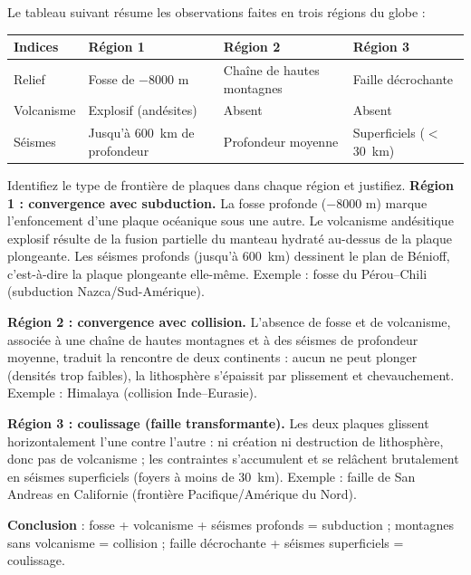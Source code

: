 \documentclass[11pt]{article}
\begin{document}
\begin{exoresolu}
Le tableau suivant résume les observations faites en trois régions du globe :
\begin{center}
\begin{tabularx}{\linewidth}{|l|X|X|X|}\hline
\rowcolor{popblueL} \textbf{Indices} & \textbf{Région 1} & \textbf{Région 2} & \textbf{Région 3} \\ \hline
Relief & Fosse de \num{-8000} m & Chaîne de hautes montagnes & Faille décrochante \\ \hline
Volcanisme & Explosif (andésites) & Absent & Absent \\ \hline
Séismes & Jusqu'à \SI{600}{km} de profondeur & Profondeur moyenne & Superficiels ($<$ \SI{30}{km}) \\ \hline
\end{tabularx}
\end{center}
Identifiez le type de frontière de plaques dans chaque région et justifiez.
\tcblower
\textbf{Région 1 : convergence avec subduction.} La fosse profonde (\num{-8000} m) marque l'enfoncement d'une plaque océanique sous une autre. Le volcanisme andésitique explosif résulte de la fusion partielle du manteau hydraté au-dessus de la plaque plongeante. Les séismes profonds (jusqu'à \SI{600}{km}) dessinent le plan de Bénioff, c'est-à-dire la plaque plongeante elle-même. Exemple : fosse du Pérou--Chili (subduction Nazca/Sud-Amérique).

\textbf{Région 2 : convergence avec collision.} L'absence de fosse et de volcanisme, associée à une chaîne de hautes montagnes et à des séismes de profondeur moyenne, traduit la rencontre de deux continents : aucun ne peut plonger (densités trop faibles), la lithosphère s'épaissit par plissement et chevauchement. Exemple : Himalaya (collision Inde--Eurasie).

\textbf{Région 3 : coulissage (faille transformante).} Les deux plaques glissent horizontalement l'une contre l'autre : ni création ni destruction de lithosphère, donc pas de volcanisme ; les contraintes s'accumulent et se relâchent brutalement en séismes superficiels (foyers à moins de \SI{30}{km}). Exemple : faille de San Andreas en Californie (frontière Pacifique/Amérique du Nord).

\textbf{Conclusion} : fosse + volcanisme + séismes profonds = subduction ; montagnes sans volcanisme = collision ; faille décrochante + séismes superficiels = coulissage.
\end{exoresolu}
\end{document}
